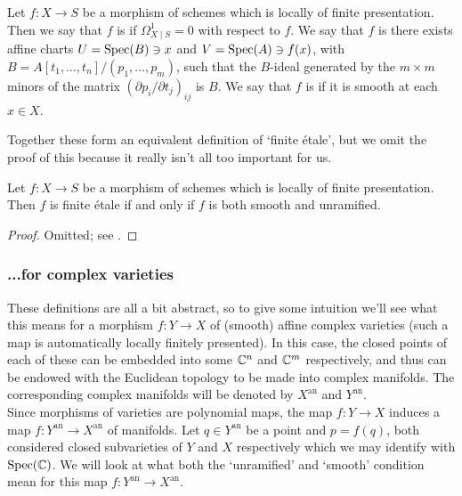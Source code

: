 \begin{defn}
	Let $f: X \to S$ be a morphism of schemes which is locally of finite presentation. Then we say that $f$ is  if $\Omega^1_{X \mid S}=0$ with respect to $f$. We say that $f$ is  there exists affine charts $U = \mathrm{Spec}(B) \ni x$ and $V = \mathrm{Spec}(A) \ni f(x)$, with $B = A[t_1, \ldots, t_n]/(p_1, \ldots, p_m)$, such that the $B$-ideal generated by the $m\times m$ minors of the matrix $(\partial p_i / \partial t_j)_{ij}$ is $B$. We say that $f$ is  if it is smooth at each $x \in X$.
\end{defn}

Together these form an equivalent definition of `finite \'etale', but we omit the proof of this because it really isn't all too important for us.

\begin{thm}
	\label{thm:fet_iff_sm_and_unr}
	Let $f:X \to S$ be a morphism of schemes which is locally of finite presentation. Then $f$ is finite \'etale if and only if $f$ is both smooth and unramified.
\end{thm}
\begin{proof}
	Omitted; see \cite[Corollaire 17.6.2]{EGAIV}.
\end{proof}



\subsubsection{...for complex varieties}
\label{subsubsec:2_4_4_geometric_intuition}
These definitions are all a bit abstract, so to give some intuition we'll see what this means for a morphism $f : Y \to X$ of (smooth) affine complex varieties (such a map is automatically locally finitely presented). In this case, the closed points of each of these can be embedded into some $\mathbb{C}^n$ and $\mathbb{C}^m$ respectively, and thus can be endowed with the Euclidean topology to be made into complex manifolds. The corresponding complex manifolds will be denoted by $X^\text{an}$ and $Y^\text{an}$.\\

Since morphisms of varieties are polynomial maps, the map $f : Y \to X$ induces a map $f:Y^\text{an} \to X^\text{an}$ of manifolds. Let $q \in Y^\text{an}$ be a point and $p = f(q)$, both considered closed subvarieties of $Y$ and $X$ respectively which we may identify with $\mathrm{Spec}(\mathbb{C})$. We will look at what both the `unramified' and `smooth' condition mean for this map $f: Y^\text{an} \to X^\text{an}$. 

